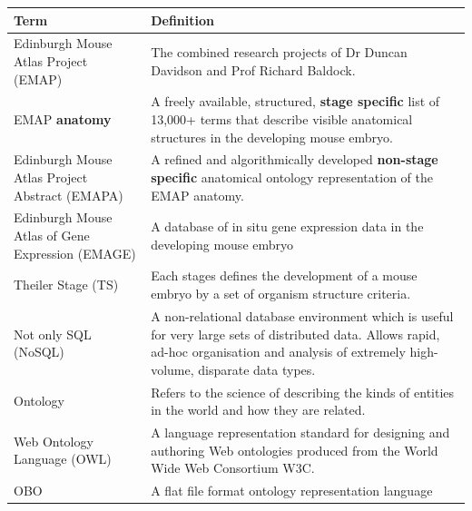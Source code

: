\begin{center}
    \begin{tabular}{ |p{0.3\linewidth} | p{0.7\linewidth} |}
    \hline
    \textbf{Term} & \textbf{Definition} \\ \hline
    Edinburgh Mouse Atlas Project (EMAP) & The combined research projects of Dr Duncan Davidson and Prof Richard Baldock. \\ \hline
    EMAP \textbf{anatomy} & A freely available, structured, \textbf{stage specific} list of 13,000+ terms that describe visible anatomical structures in the developing mouse embryo. \\ \hline
    Edinburgh Mouse Atlas Project Abstract (EMAPA) & A refined and algorithmically developed \textbf{non-stage specific} anatomical ontology representation of the EMAP anatomy. \\ \hline
    Edinburgh Mouse Atlas of Gene Expression (EMAGE) & A database of in situ gene expression data in the developing mouse embryo  \\ \hline
    Theiler Stage (TS) & Each stages defines the development of a mouse embryo by a set of organism structure criteria. \\ \hline
    Not only SQL (NoSQL) & A non-relational database environment which is useful for very large sets of distributed data. Allows rapid, ad-hoc organisation and analysis of extremely high-volume, disparate data types. \\ \hline
        Ontology & Refers to the science of describing the kinds of entities in the world and how they are related. \\ \hline
            Web Ontology Language (OWL) & A language representation standard for designing and authoring Web ontologies produced from the World Wide Web Consortium W3C. \\ \hline
          OBO & A flat file format ontology representation language \\ \hline
    \end{tabular}
\end{center}

